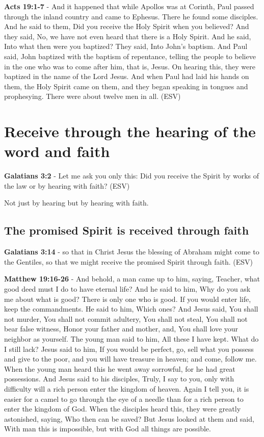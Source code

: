 \documentclass[11pt]{article}
\begin{document}
\textbf{Acts 19:1-7} - And it happened that while Apollos was at Corinth, Paul passed through the inland country and came to Ephesus. There he found some disciples. And he said to them, Did you receive the Holy Spirit when you believed? And they said, No, we have not even heard that there is a Holy Spirit. And he said, Into what then were you baptized? They said, Into John's baptism. And Paul said, John baptized with the baptism of repentance, telling the people to believe in the one who was to come after him, that is, Jesus. On hearing this, they were baptized in the name of the Lord Jesus. And when Paul had laid his hands on them, the Holy Spirit came on them, and they began speaking in tongues and prophesying. There were about twelve men in all. (ESV)

\section{Receive through the hearing of the word and faith}
\label{sec:org1ed95fd}
\textbf{Galatians 3:2} - Let me ask you only this: Did you receive the Spirit by works of the law or by hearing with faith? (ESV)

Not just by hearing but by hearing with faith.

\subsection{The promised Spirit is received through faith}
\label{sec:orgdd299a9}
\textbf{Galatians 3:14} - so that in Christ Jesus the blessing of Abraham might come to the Gentiles, so that we might receive the promised Spirit through faith. (ESV)

\textbf{Matthew 19:16-26} - And behold, a man came up to him, saying, Teacher, what good deed must I do to have eternal life? And he said to him, Why do you ask me about what is good? There is only one who is good. If you would enter life, keep the commandments. He said to him, Which ones? And Jesus said, You shall not murder, You shall not commit adultery, You shall not steal, You shall not bear false witness, Honor your father and mother, and, You shall love your neighbor as yourself. The young man said to him, All these I have kept. What do I still lack? Jesus said to him, If you would be perfect, go, sell what you possess and give to the poor, and you will have treasure in heaven; and come, follow me. When the young man heard this he went away sorrowful, for he had great possessions. And Jesus said to his disciples, Truly, I say to you, only with difficulty will a rich person enter the kingdom of heaven. Again I tell you, it is easier for a camel to go through the eye of a needle than for a rich person to enter the kingdom of God. When the disciples heard this, they were greatly astonished, saying, Who then can be saved? But Jesus looked at them and said, With man this is impossible, but with God all things are possible.
\end{document}
